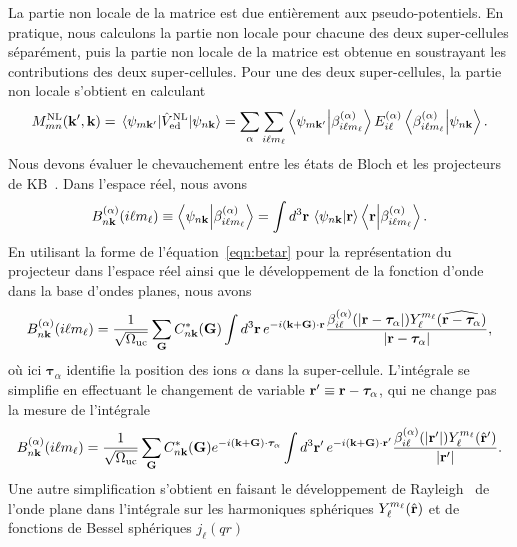 La partie non locale de la matrice est due entièrement aux pseudo-potentiels. En pratique, nous calculons la partie non locale pour chacune des deux super-cellules séparément, puis la partie non locale de la matrice est obtenue en soustrayant les contributions des deux super-cellules. Pour une des deux super-cellules, la partie non locale s'obtient en calculant
\begin{equation}
    M_{mn}^\text{NL}(\kv',\kv) = \matrixel{\psi_{m\kv'}}{\hat{V}_\text{ed}^\text{NL}}{\psi_{n\kv}} = \sum_\alpha\sum_{i\ell m_\ell}\braket{\psi_{m\kv'}}{\beta^{(\alpha)}_{i\ell m_\ell}}E_{i\ell}^{(\alpha)}\braket{\beta^{(\alpha)}_{i\ell m_\ell}}{\psi_{n\kv}}.\label{eqn:M_NL}
\end{equation}
Nous devons évaluer le chevauchement entre les états de Bloch et les projecteurs de KB~\cite{kleinmanEfficaciousFormModel1982}. Dans l'espace réel, nous avons
\begin{equation}
    B_{n\mathbf{k}}^{(\alpha)}(i\ell m_\ell)\equiv\braket{\psi_{n\mathbf{k}}}{\beta_{i\ell m_\ell}^{(\alpha)}} = \int d^3\mathbf{r}\,\braket{\psi_{n\mathbf{k}}}{\mathbf{r}}\braket{\mathbf{r}}{\beta_{i\ell m_\ell}^{(\alpha)}}.
\end{equation}
En utilisant la forme de l'équation~\eqref{eqn:betar} pour la représentation du projecteur dans l'espace réel ainsi que le développement de la fonction d'onde dans la base d'ondes planes, nous avons
\begin{equation}
    B_{n\mathbf{k}}^{(\alpha)}(i\ell m_\ell) =\frac{1}{\sqrt{\Omega_\text{uc}}}\sum_{\mathbf{G}} C^*_{n\mathbf{k}}(\mathbf{G})\int d^3\mathbf{r}\,e^{-i(\mathbf{k}+\mathbf{G})\cdot\mathbf{r}}\frac{\beta_{i\ell}^{(\alpha)}(|\mathbf{r}-\bm{\tau}_\alpha|)Y_\ell^{m_\ell}(\widehat{\mathbf{r}-\bm{\tau}_\alpha})}{|\mathbf{r}-\bm{\tau}_\alpha|},
\end{equation}
où ici $\bm{\tau}_\alpha$ identifie la position des ions $\alpha$ dans la super-cellule. L'intégrale se simplifie en effectuant le changement de variable $\mathbf{r}'\equiv\mathbf{r}-\bm{\tau}_\alpha$, qui ne change pas la mesure de l'intégrale
\begin{equation}
    B_{n\mathbf{k}}^{(\alpha)}(i\ell m_\ell) =\frac{1}{\sqrt{\Omega_\text{uc}}}\sum_{\mathbf{G}} C^*_{n\mathbf{k}}(\mathbf{G})e^{-i(\mathbf{k}+\mathbf{G})\cdot\bm{\tau}_{\alpha}}\int d^3\mathbf{r}'\, e^{-i(\mathbf{k}+\mathbf{G})\cdot\mathbf{r}'}\frac{\beta_{i\ell}^{(\alpha)}(|\mathbf{r}'|)Y_\ell^{m_\ell}(\hat{\mathbf{r}}')}{|\mathbf{r}'|}.
\end{equation}
Une autre simplification s'obtient en faisant le développement de Rayleigh~\cite{arfkenMathematicalMethodsPhysicists2013} de l'onde plane dans l'intégrale sur les harmoniques sphériques $Y_\ell^{m_\ell}(\hat{\mathbf{r}})$ et de fonctions de Bessel sphériques $j_\ell(qr)$
